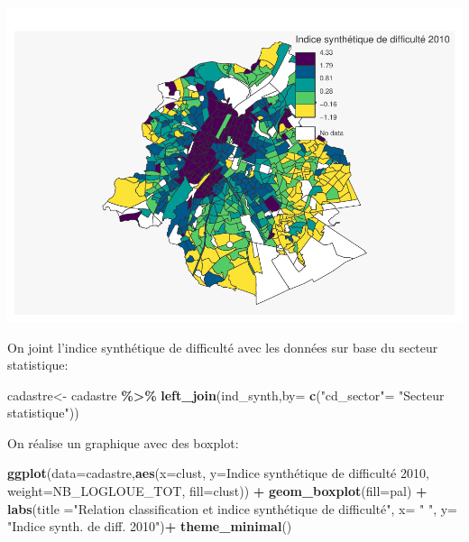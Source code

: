 \documentclass[
]{book}
\newenvironment{Shaded}{\begin{snugshade}}{\end{snugshade}}
\newcommand{\AttributeTok}[1]{\textcolor[rgb]{0.13,0.29,0.53}{#1}}
\newcommand{\FunctionTok}[1]{\textcolor[rgb]{0.13,0.29,0.53}{\textbf{#1}}}
\newcommand{\NormalTok}[1]{#1}
\newcommand{\OtherTok}[1]{\textcolor[rgb]{0.56,0.35,0.01}{#1}}
\newcommand{\SpecialCharTok}[1]{\textcolor[rgb]{0.81,0.36,0.00}{\textbf{#1}}}
\newcommand{\StringTok}[1]{\textcolor[rgb]{0.31,0.60,0.02}{#1}}
\begin{document}
\includegraphics{bookdown-demo_files/figure-latex/unnamed-chunk-110-1.pdf}

On joint l'indice synthétique de difficulté avec les données sur base du secteur statistique:

\begin{Shaded}
\begin{Highlighting}[]
\NormalTok{cadastre}\OtherTok{\textless{}{-}}\NormalTok{ cadastre }\SpecialCharTok{\%\textgreater{}\%}
  \FunctionTok{left\_join}\NormalTok{(ind\_synth,}\AttributeTok{by=} \FunctionTok{c}\NormalTok{(}\StringTok{"cd\_sector"}\OtherTok{=} \StringTok{"Secteur statistique"}\NormalTok{))}
\end{Highlighting}
\end{Shaded}

On réalise un graphique avec des boxplot:

\begin{Shaded}
\begin{Highlighting}[]
\FunctionTok{ggplot}\NormalTok{(}\AttributeTok{data=}\NormalTok{cadastre,}\FunctionTok{aes}\NormalTok{(}\AttributeTok{x=}\NormalTok{clust,}
                           \AttributeTok{y=}\StringTok{\textasciigrave{}}\AttributeTok{Indice synthétique de difficulté 2010}\StringTok{\textasciigrave{}}\NormalTok{,}
                           \AttributeTok{weight=}\NormalTok{NB\_LOGLOUE\_TOT,}
                           \AttributeTok{fill=}\NormalTok{clust)) }\SpecialCharTok{+}
\FunctionTok{geom\_boxplot}\NormalTok{(}\AttributeTok{fill=}\NormalTok{pal) }\SpecialCharTok{+}
\FunctionTok{labs}\NormalTok{(}\AttributeTok{title =}\StringTok{"Relation classification et indice synthétique de difficulté"}\NormalTok{,}
       \AttributeTok{x=} \StringTok{" "}\NormalTok{,}
       \AttributeTok{y=} \StringTok{"Indice synth. de diff. 2010"}\NormalTok{)}\SpecialCharTok{+}
\FunctionTok{theme\_minimal}\NormalTok{()}
\end{Highlighting}
\end{Shaded}
\end{document}
